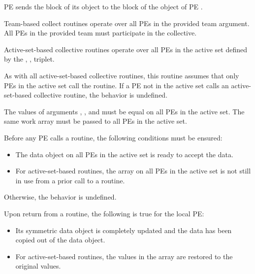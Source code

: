 \begin{apidefinition}
{    \ac{PE}  sends the \lth block of its  object to
    the \kth block of
    the  object of \ac{PE} .

    Team-based collect routines operate over all \acp{PE} in the provided team
    argument. All \acp{PE} in the provided team must participate in the collective.

    Active-set-based collective routines operate over all \acp{PE} in the active set
    defined by the , ,  triplet.

    As with all active-set-based collective routines,
    this routine assumes that only \acp{PE} in the active set call the routine.
    If a \ac{PE} not in the active set calls an
    active-set-based collective routine,
    the behavior is undefined.

    The values of arguments , ,
    and  must be equal on all \acp{PE} in the active set. The same
     work
    array must be passed to all \acp{PE} in the active set.

    Before any \ac{PE} calls a  routine,
    the following conditions must be ensured:
    \begin{itemize}
    \item The  data object on all \acp{PE} in the active set is
      ready to accept the  data.
    \item For active-set-based routines, the  array
    on all \acp{PE} in the active set is not still in use from a prior call
    to a  routine.
    \end{itemize}
    Otherwise, the behavior is undefined.

    Upon return from a  routine, the following is true for
    the local PE:
    \begin{itemize}
    \item Its  symmetric data object is completely updated and
    the data has been copied out of the  data object.
    \item For active-set-based routines,
    the values in the  array are restored to the original values.
    \end{itemize}
}



\end{apidefinition}
